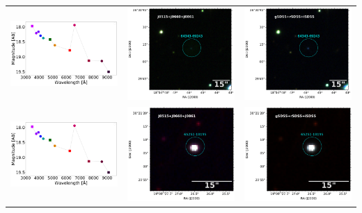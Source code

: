 \begin{table}
\begin{tabular}{ccc}
\includegraphics[width=0.3\linewidth, clip]{figs-pca/photospectrum_64343-69243-Missing-pne-allinf-v2_MAG_APER_6_0.pdf} & \includegraphics[width=0.3\linewidth, clip]{Field_64343/1000001-JPLUS-01278-v202006_J0861_64343-69243-RGB.pdf} & \includegraphics[width=0.3\linewidth, clip]{Field_64343/1000001-JPLUS-01278-v202006_iSDSS_64343-69243-RGB.pdf} \\
\includegraphics[width=0.3\linewidth, clip]{figs-pca/photospectrum_64343-69243-Missing-pne-allinf-v2_MAG_APER_6_0.pdf} & \includegraphics[width=0.3\linewidth, clip]{Field_65251/1000001-JPLUS-01485-v202006_J0861_65251-18195-RGB.pdf} & \includegraphics[width=0.3\linewidth, clip]{Field_65251/1000001-JPLUS-01485-v202006_iSDSS_65251-18195-RGB.pdf} \\

\end{tabular}
\end{table}
